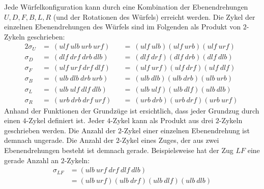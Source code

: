 \documentclass[12pt,a4paper, usenames, dvipsnames]{article}
\theoremstyle{mystyle}
\theoremstyle{definition}
\begin{document}
Jede Würfelkonfiguration kann durch eine Kombination der Ebenendrehungen $U, D, F, B, L, R$ (und der Rotationen des Würfels) erreicht werden. 
Die Zykel der einzelnen Ebenendrehungen des Würfels sind im Folgenden als Produkt von $2$-Zykeln geschrieben:
\begin{alignat*}{2}
\sigma_U &  = \ ( \textit{ulf} \ \textit{ulb} \ \textit{urb} \ \textit{urf} ) &&  = \ ( \textit{ulf} \ \textit{ulb} ) 
( \textit{ulf} \ \textit{urb} ) 
( \textit{ulf} \  \textit{urf} )\\

\sigma_D & = \ ( \textit{dlf} \ \textit{drf} \ \textit{drb} \ \textit{dlb} )  && = \ ( \textit{dlf} \ \textit{drf} ) 
( \textit{dlf} \ \textit{drb}  ) 
( \textit{dlf} \ \textit{dlb} )\\

\sigma_F & = \ ( \textit{ulf} \ \textit{urf} \ \textit{drf} \ \textit{dlf} )  && = \ ( \textit{ulf} \ \textit{urf} )
( \textit{ulf} \ \textit{drf} )
( \textit{ulf}  \ \textit{dlf} ) \\

\sigma_B & = \ ( \textit{ulb} \ \textit{dlb} \ \textit{drb} \ \textit{urb} )  && = \ ( \textit{ulb} \ \textit{dlb} )
( \textit{ulb} \  \textit{drb} )
( \textit{ulb}  \ \textit{urb} )\\

\sigma_L & = \ ( \textit{ulb} \ \textit{ulf} \ \textit{dlf} \ \textit{dlb} )  && = \ ( \textit{ulb} \ \textit{ulf} ) 
( \textit{ulb} \ \textit{dlf}  ) 
( \textit{ulb} \ \textit{dlb} ) \\

\sigma_R & = \ ( \textit{urb} \ \textit{drb} \ \textit{drf} \ \textit{urf} ) && = \  ( \textit{urb} \ \textit{drb}  ) 
( \textit{urb} \  \textit{drf} ) 
( \textit{urb} \ \textit{urf} )  \
\end{alignat*}
Anhand der Funktionen der Grundzüge ist ersichtlich, dass jeder Grundzug durch einen $4$-Zykel definiert ist.
Jeder $4$-Zykel kann als Produkt aus drei $2$-Zykeln geschrieben werden. 
Die Anzahl der $2$-Zykel einer einzelnen Ebenendrehung ist demnach ungerade. Die Anzahl der $2$-Zykel eines Zuges, der aus zwei Ebenendrehungen besteht ist demnach gerade.
Beispielsweise hat der Zug $LF$ eine gerade Anzahl an $2$-Zykeln:
\begin{align*}
\sigma_{LF} & = (\textit{ulb} \ \textit{urf} \ \textit{drf} \ \textit{dlf} \ \textit{dlb}) \\
 & =  (\textit{ulb} \ \textit{urf})(\textit{ulb} \ \textit{drf})(\textit{ulb} \ \textit{dlf})(\textit{ulb} \ \textit{dlb})
\end{align*}
\end{document}
